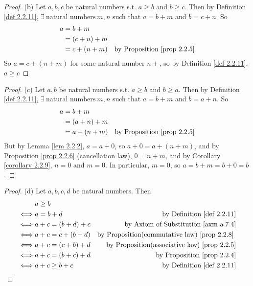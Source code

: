 \begin{proof}{(b)}
Let \(a, b, c\) be natural numbers s.t. \(a \geq b\) and \(b \geq c\). Then by Definition \ref{def 2.2.11}, \(\exists\ \text{natural numbers}\ m, n\) such that \(a = b + m\) and \(b = c + n\). So
\begin{align*}
    a & = b + m & \\
      & = (c + n) + m & \\
      & = c + (n + m) & \text{by Proposition \ref{prop 2.2.5}}\\
\end{align*}
So \(a = c + (n + m)\) for some natural number \(n + \), so by Definition \ref{def 2.2.11}, \(a \geq c\)
\end{proof}
\begin{proof}{(c)}
Let \(a, b\) be natural numbers s.t. \(a \geq b\) and \(b \geq a\). Then by Definition \ref{def 2.2.11}, \(\exists\ \text{natural numbers}\ m, n\) such that \(a = b + m\) and \(b = a + n\). So
\begin{align*}
    a & = b + m & \\
      & = (a + n) + m & \\
      & = a + (n + m) & \text{by Proposition \ref{prop 2.2.5}}\\
\end{align*}
But by Lemma \ref{lem 2.2.2}, \(a = a + 0\), so \(a + 0 = a + (n + m)\), and by Proposition \ref{prop 2.2.6} (cancellation law), \(0 = n + m\), and by Corollary \ref{corollary 2.2.9}, \(n = 0\) and \(m = 0\). In particular, \(m = 0\), so \(a = b + m = b + 0 = b\).
\end{proof}
\begin{proof}{(d)}
Let \(a, b, c, d\) be natural numbers. Then
\begin{align*}
         & a \geq b \\
    \iff & a = b + d             & \text{by Definition \ref{def 2.2.11}} \\
    \iff & a + c = (b + d) + c   & \text{by Axiom of Substitution \ref{axm a.7.4}} \\ 
    \iff & a + c = c + (b + d)   & \text{by Proposition(commutative law) \ref{prop 2.2.8} } \\
    \iff & a + c = (c + b) + d   & \text{by Proposition(associative law) \ref{prop 2.2.5}} \\
    \iff & a + c = (b + c) + d   & \text{by Proposition \ref{prop 2.2.4}} \\
    \iff & a + c \geq b + c      & \text{by Definition \ref{def 2.2.11}}
\end{align*}
\end{proof}
